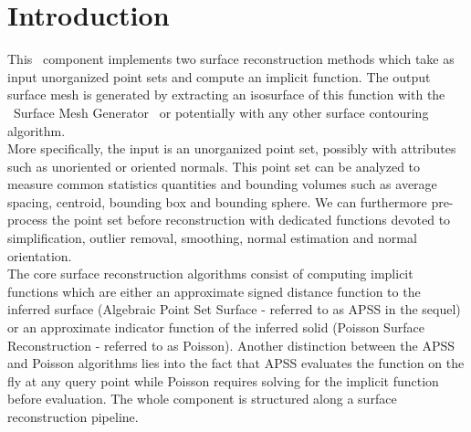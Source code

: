 \section{Introduction}

This \cgal\ component implements two surface reconstruction methods which take as input unorganized point sets and compute an implicit function. The output surface mesh is generated by extracting an isosurface of this function with the \cgal\ Surface Mesh Generator~\cite{cgal:ry-gsddrm-06} or potentially with any other surface contouring algorithm. \\

More specifically, the input is an unorganized point set, possibly with attributes such as unoriented or oriented normals. This point set can be analyzed to measure common statistics quantities and bounding volumes such as average spacing, centroid, bounding box and bounding sphere. We can furthermore pre-process the point set before reconstruction with dedicated functions devoted to simplification, outlier removal, smoothing, normal estimation and normal orientation.\\

The core surface reconstruction algorithms consist of computing implicit functions which are either an approximate signed distance function to the inferred surface (Algebraic Point Set Surface - referred to as APSS in the sequel) or an approximate indicator function of the inferred solid (Poisson Surface Reconstruction - referred to as Poisson). Another distinction between the APSS and Poisson algorithms lies into the fact that APSS evaluates the function on the fly at any query point while Poisson requires solving for the implicit function before evaluation. The whole component is structured along a surface reconstruction pipeline.

